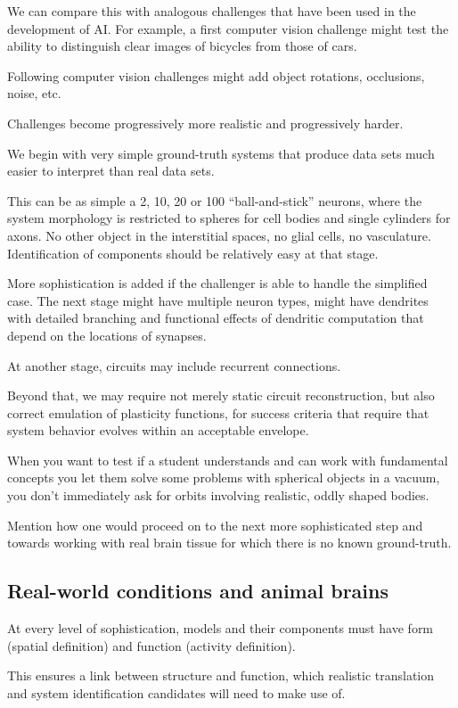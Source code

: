 \documentclass{ldr-article}
\begin{document}
We can compare this with analogous challenges that have been used in the development of AI. For example, a first computer vision challenge might test the ability to distinguish clear images of bicycles from those of cars.

Following computer vision challenges might add object rotations, occlusions, noise, etc.

Challenges become progressively more realistic and progressively harder.

We begin with 	very simple ground-truth systems that produce data sets much easier 	to interpret than real data sets.

This can be as simple a 2, 10, 20 or 100 “ball-and-stick” neurons, where the system morphology is restricted to spheres for cell bodies and single cylinders for axons. No other object in the interstitial spaces, no glial cells, no vasculature. Identification of components should be relatively easy at that stage.

More sophistication is added if the challenger is able to handle the simplified case. The next stage might have multiple neuron types, might have dendrites with detailed branching and functional effects of dendritic computation that depend on the locations of synapses.

At another stage, circuits may include recurrent connections.

Beyond that, we may require not merely static circuit reconstruction, but also correct emulation of plasticity functions, for success criteria that require that system behavior evolves within an acceptable envelope.

When you want to test if a student understands and can work with fundamental concepts you let them solve some problems with spherical objects in a vacuum, you don’t immediately ask for orbits involving realistic, oddly shaped bodies.

Mention how one would proceed on to the next more sophisticated step and towards working with real brain tissue for which there is no known ground-truth.

\subsection{Real-world conditions and animal brains}

At every level of sophistication, models and their components must have form (spatial definition) and function (activity definition).

This ensures a link between structure and function, which realistic translation and system identification candidates will need to make use of.
\end{document}
